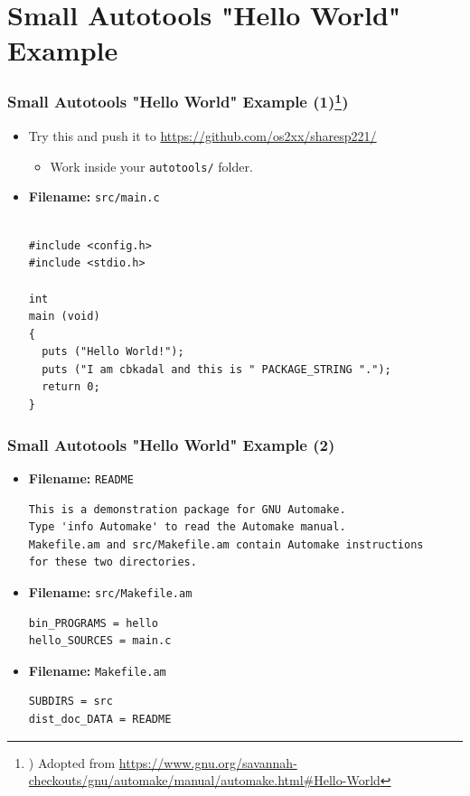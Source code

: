 \documentclass[aspectratio=169, xcolor=table, notheorems, hyperref={pdfpagelabels=false}]{beamer}
\begin{document}
\section{Small Autotools "Hello World" Example}
\begin{frame}[fragile]
\frametitle{Small Autotools "Hello World" Example (1)\footnote{%
) Adopted from {\tiny \url{https://www.gnu.org/savannah-checkouts/gnu/automake/manual/automake.html\#Hello-World}}%
})}

\begin{itemize}
\item Try this and push it to \url{https://github.com/os2xx/sharesp221/}
\begin{itemize}
\item Work inside your \texttt{autotools/} folder.
\end{itemize}

\item \textbf{Filename:} \texttt{src/main.c}
\begin{lstlisting}[basicstyle=\ttfamily\small]

#include <config.h>
#include <stdio.h>

int
main (void)
{
  puts ("Hello World!");
  puts ("I am cbkadal and this is " PACKAGE_STRING ".");
  return 0;
}

\end{lstlisting}
\end{itemize}

\end{frame}

\begin{frame}[fragile]
\frametitle{Small Autotools "Hello World" Example (2)}

\begin{itemize}
\item \textbf{Filename:} \texttt{README}
\begin{lstlisting}[basicstyle=\ttfamily\small]
This is a demonstration package for GNU Automake.
Type 'info Automake' to read the Automake manual.
Makefile.am and src/Makefile.am contain Automake instructions 
for these two directories.
\end{lstlisting}

\item \textbf{Filename:} \texttt{src/Makefile.am}
\begin{lstlisting}[basicstyle=\ttfamily\small]
bin_PROGRAMS = hello
hello_SOURCES = main.c
\end{lstlisting}

\item \textbf{Filename:} \texttt{Makefile.am}
\begin{lstlisting}[basicstyle=\ttfamily\small]
SUBDIRS = src
dist_doc_DATA = README

\end{lstlisting}
\end{itemize}

\end{frame}
\end{document}
